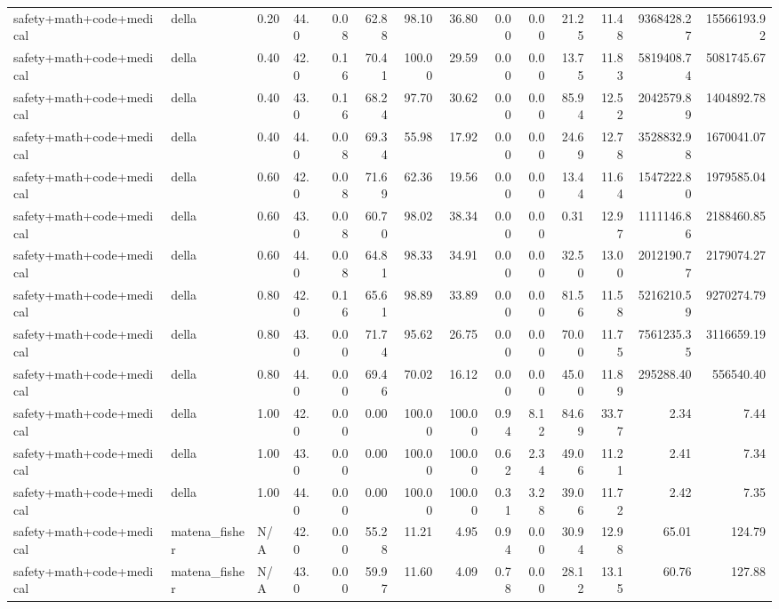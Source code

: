 \documentclass{article}
\begin{document}
\begin{table}[H]
{\begin{tabular}{llllrrrrrrrrrr}
safety+math+code+medical & della & 0.20 & 44.0 & 0.08 & 62.88 & 98.10 & 36.80 & 0.00 & 0.00 & 21.25 & 11.48 & 9368428.27 & 15566193.92 \\
safety+math+code+medical & della & 0.40 & 42.0 & 0.16 & 70.41 & 100.00 & 29.59 & 0.00 & 0.00 & 13.75 & 11.83 & 5819408.74 & 5081745.67 \\
safety+math+code+medical & della & 0.40 & 43.0 & 0.16 & 68.24 & 97.70 & 30.62 & 0.00 & 0.00 & 85.94 & 12.52 & 2042579.89 & 1404892.78 \\
safety+math+code+medical & della & 0.40 & 44.0 & 0.08 & 69.34 & 55.98 & 17.92 & 0.00 & 0.00 & 24.69 & 12.78 & 3528832.98 & 1670041.07 \\
safety+math+code+medical & della & 0.60 & 42.0 & 0.08 & 71.69 & 62.36 & 19.56 & 0.00 & 0.00 & 13.44 & 11.64 & 1547222.80 & 1979585.04 \\
safety+math+code+medical & della & 0.60 & 43.0 & 0.08 & 60.70 & 98.02 & 38.34 & 0.00 & 0.00 & 0.31 & 12.97 & 1111146.86 & 2188460.85 \\
safety+math+code+medical & della & 0.60 & 44.0 & 0.08 & 64.81 & 98.33 & 34.91 & 0.00 & 0.00 & 32.50 & 13.00 & 2012190.77 & 2179074.27 \\
safety+math+code+medical & della & 0.80 & 42.0 & 0.16 & 65.61 & 98.89 & 33.89 & 0.00 & 0.00 & 81.56 & 11.58 & 5216210.59 & 9270274.79 \\
safety+math+code+medical & della & 0.80 & 43.0 & 0.00 & 71.74 & 95.62 & 26.75 & 0.00 & 0.00 & 70.00 & 11.75 & 7561235.35 & 3116659.19 \\
safety+math+code+medical & della & 0.80 & 44.0 & 0.00 & 69.46 & 70.02 & 16.12 & 0.00 & 0.00 & 45.00 & 11.89 & 295288.40 & 556540.40 \\
safety+math+code+medical & della & 1.00 & 42.0 & 0.00 & 0.00 & 100.00 & 100.00 & 0.94 & 8.12 & 84.69 & 33.77 & 2.34 & 7.44 \\
safety+math+code+medical & della & 1.00 & 43.0 & 0.00 & 0.00 & 100.00 & 100.00 & 0.62 & 2.34 & 49.06 & 11.21 & 2.41 & 7.34 \\
safety+math+code+medical & della & 1.00 & 44.0 & 0.00 & 0.00 & 100.00 & 100.00 & 0.31 & 3.28 & 39.06 & 11.72 & 2.42 & 7.35 \\
safety+math+code+medical & matena\_fisher & N/A & 42.0 & 0.00 & 55.28 & 11.21 & 4.95 & 0.94 & 0.00 & 30.94 & 12.98 & 65.01 & 124.79 \\
safety+math+code+medical & matena\_fisher & N/A & 43.0 & 0.00 & 59.97 & 11.60 & 4.09 & 0.78 & 0.00 & 28.12 & 13.15 & 60.76 & 127.88 \\

\end{tabular}}
\end{table}
\end{document}
